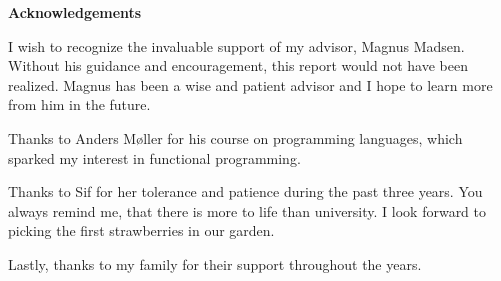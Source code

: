 \documentclass[../main.tex]{subfiles}
\begin{document}
\titlepage
\null\vfil
\begin{center}
\normalfont\large\bfseries Acknowledgements
\end{center}

I wish to recognize the invaluable support of my advisor, Magnus Madsen. Without his guidance and encouragement, this report would not have been realized. Magnus has been a wise and patient advisor and I hope to learn more from him in the future.

Thanks to Anders Møller for his course on programming languages, which sparked my interest in functional programming.

Thanks to Sif for her tolerance and patience during the past three years. You always remind me, that there is more to life than university. I look forward to picking the first strawberries in our garden.

Lastly, thanks to my family for their support throughout the years.

{\par\vfil\null\endtitlepage}
\end{document}
